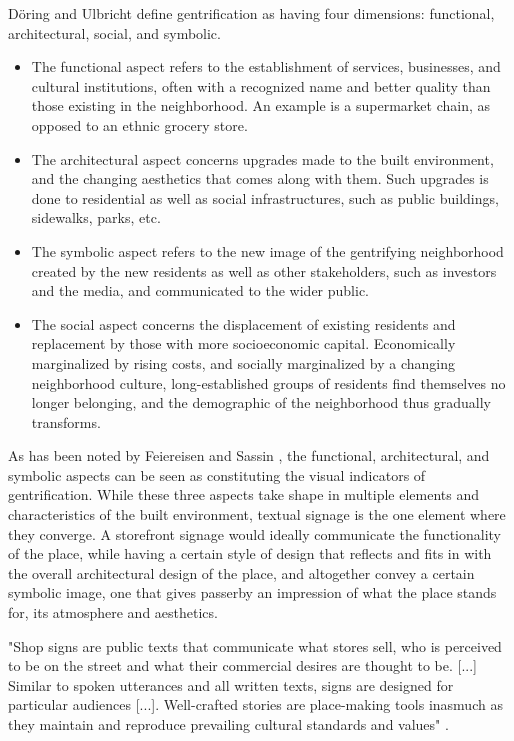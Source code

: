 Döring and Ulbricht \cite{döring_ulbricht_2018} define gentrification as having four dimensions: functional, architectural, social, and symbolic. 
\begin{itemize}
    \item The functional aspect refers to the establishment of services, businesses, and cultural institutions, often with a recognized name and better quality than those existing in the neighborhood. An example is a supermarket chain, as opposed to an ethnic grocery store.
    \item The architectural aspect concerns upgrades made to the built environment, and the changing aesthetics that comes along with them. Such upgrades is done to residential as well as social infrastructures, such as public buildings, sidewalks, parks, etc. 
    \item The symbolic aspect refers to the new image of the gentrifying neighborhood created by the new residents as well as other stakeholders, such as investors and the media, and communicated to the wider public.
    \item The social aspect concerns the displacement of existing residents and replacement by those with more socioeconomic capital. Economically marginalized by rising costs, and socially marginalized by a changing neighborhood culture, long-established groups of residents find themselves no longer belonging, and the demographic of the neighborhood thus gradually transforms.
\end{itemize}

As has been noted by Feiereisen and Sassin \cite{feiereisen2021}, the functional, architectural, and symbolic aspects can be seen as constituting the visual indicators of gentrification. While these three aspects take shape in multiple elements and characteristics of the built environment, textual signage is the one element where they converge. A storefront signage would ideally communicate the functionality of the place, while having a certain style of design that reflects and fits in with the overall architectural design of the place, and altogether convey a certain symbolic image, one that gives passerby an impression of what the place stands for, its atmosphere and aesthetics. 

\begin{displayquote}
    "Shop signs are public texts that communicate what stores sell, who is perceived to be on the street and what their commercial desires are thought to be. [...] Similar to spoken utterances and all written texts, signs are designed for particular audiences [...]. Well-crafted stories are place-making tools inasmuch as they maintain and reproduce prevailing cultural standards and values" \cite{trinch_signsays_2017}. 
\end{displayquote}

